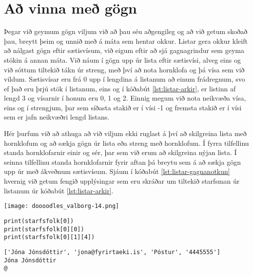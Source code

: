 \section{Að vinna með gögn}\label{uk:gagnavinnsla-listar}
Þegar við geymum gögn viljum við að þau séu aðgengileg og að við getum skoðað þau, breytt þeim og unnið með á máta sem hentar okkur.
Listar gera okkur kleift að nálgast gögn eftir sætisvísum, við eigum eftir að sjá gagnagrindur sem geyma stökin á annan máta.
Við náum í gögn upp úr lista eftir sætisvísi, alveg eins og við sóttum tiltekið tákn úr streng, með því að nota hornklofa og þá vísa sem við vildum.
Sætisvísar eru frá 0 upp í lengdina á listanum að einum frádregnum, svo ef það eru þrjú stök í listanum, eins og í kóðabút \ref{lst:listar-arkir}, er listinn af lengd 3 og vísarnir í honum eru 0, 1 og 2.
Einnig megum við nota neikvæða vísa, eins og í strengjum, þar sem síðasta stakið er í vísi -1 og fremsta stakið er í vísi sem er jafn neikvæðri lengd listans.

Hér þurfum við að athuga að við viljum ekki ruglast á því að skilgreina lista með hornklofum og að sækja gögn úr lista eða streng með hornklofum.
Í fyrra tilfellinu standa hornklofarnir einir og sér, þar sem við erum að skilgreina nýjan lista.
Í seinna tilfellinu standa hornklofarnir fyrir aftan þá breytu sem á að sækja gögn upp úr með ákveðnum sætisvísum.
Sjáum í kóðabút \ref{lst:listar-gagnanotkun} hvernig við getum fengið upplýsingar sem eru skráðar um tiltekið starfsman úr listanum úr kóðabút \ref{lst:listar-arkir}.

\begin{center}
	\texttt{[image: doooodles\_valborg-14.png]}
\end{center}
\newpage
\begin{lstlisting}[caption=Unnið með gögn úr lista, label=lst:listar-gagnanotkun]
print(starfsfolk[0])
print(starfsfolk[0][0])
print(starfsfolk[0][1][4])
\end{lstlisting}
\lstset{style=uttak}
\begin{lstlisting}
['Jóna Jónsdóttir', 'jona@fyrirtaeki.is', 'Póstur', '4445555']
Jóna Jónsdóttir
@
\end{lstlisting}
\lstset{style=venjulegt}

